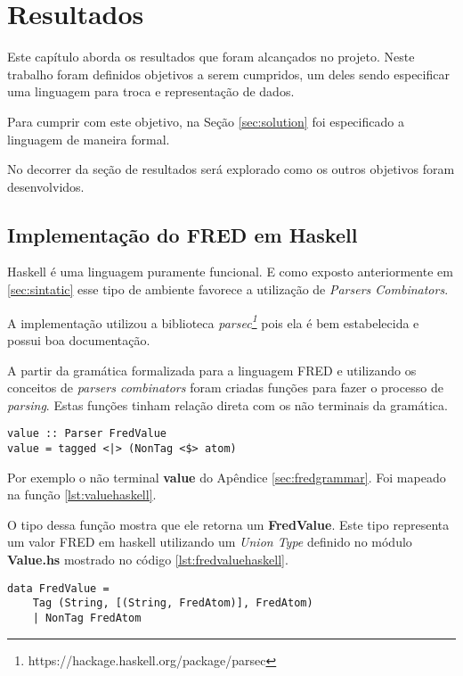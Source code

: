 \chapter[Resultados]{Resultados}

Este capítulo aborda os resultados que foram alcançados no projeto.
Neste trabalho foram definidos objetivos a serem cumpridos, um deles sendo especificar
uma linguagem para troca e representação de dados. 

Para cumprir com este objetivo, na Seção \ref{sec:solution} foi especificado 
a linguagem de maneira formal.

No decorrer da seção de resultados será explorado como os outros objetivos foram
desenvolvidos.

\section{Implementação do FRED em Haskell}

Haskell é uma linguagem puramente funcional. E como exposto anteriormente em
\ref{sec:sintatic} esse tipo de ambiente favorece a utilização 
de \textit{Parsers Combinators}.

A implementação utilizou a biblioteca 
\textit{parsec\footnote{https://hackage.haskell.org/package/parsec}}
pois ela é bem estabelecida e possui boa documentação.

A partir da gramática formalizada para a linguagem FRED e utilizando os
conceitos de \textit{parsers combinators} foram criadas funções para
fazer o processo de \textit{parsing}. Estas funções tinham relação
direta com os não terminais da gramática.

\begin{lstlisting}[caption=Parser para o não terminal value,label={lst:valuehaskell}]
value :: Parser FredValue
value = tagged <|> (NonTag <$> atom)
\end{lstlisting}

Por exemplo o não terminal \textbf{value} do Apêndice \ref{sec:fredgrammar}.
Foi mapeado na função \ref{lst:valuehaskell}. 

O tipo dessa função mostra que ele retorna um \textbf{FredValue}. 
Este tipo representa um valor FRED em haskell utilizando um 
\textit{Union Type} definido no módulo \textbf{Value.hs} 
mostrado no código \ref{lst:fredvaluehaskell}.

\begin{lstlisting}[caption=Definição do tipo FredValue,label={lst:fredvaluehaskell}]
data FredValue =
    Tag (String, [(String, FredAtom)], FredAtom) 
    | NonTag FredAtom
\end{lstlisting}

